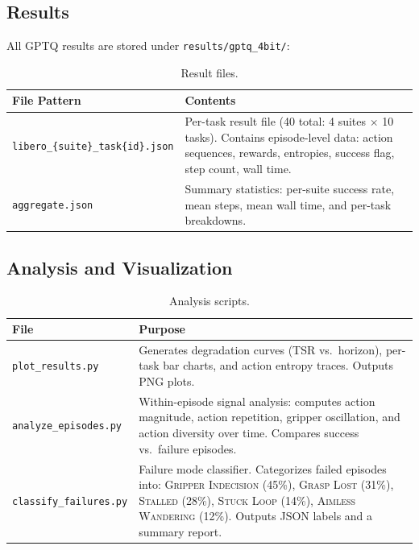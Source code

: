 \documentclass[11pt,a4paper]{article}
\begin{document}
\subsection{Results}

All GPTQ results are stored under \texttt{results/gptq\_4bit/}:

\begin{table}[h]
\centering
\begin{tabular}{@{}p{6cm}p{8.5cm}@{}}
\toprule
\textbf{File Pattern} & \textbf{Contents} \\
\midrule
\texttt{libero\_\{suite\}\_task\{id\}.json} & Per-task result file (40 total: 4 suites $\times$ 10 tasks). Contains episode-level data: action sequences, rewards, entropies, success flag, step count, wall time. \\
\texttt{aggregate.json} & Summary statistics: per-suite success rate, mean steps, mean wall time, and per-task breakdowns. \\
\bottomrule
\end{tabular}
\caption{Result files.}
\end{table}

\subsection{Analysis and Visualization}

\begin{table}[h]
\centering
\begin{tabular}{@{}p{4.5cm}p{10cm}@{}}
\toprule
\textbf{File} & \textbf{Purpose} \\
\midrule
\texttt{plot\_results.py} & Generates degradation curves (TSR vs.\ horizon), per-task bar charts, and action entropy traces. Outputs PNG plots. \\
\texttt{analyze\_episodes.py} & Within-episode signal analysis: computes action magnitude, action repetition, gripper oscillation, and action diversity over time. Compares success vs.\ failure episodes. \\
\texttt{classify\_failures.py} & Failure mode classifier. Categorizes failed episodes into: \textsc{Gripper Indecision} (45\%), \textsc{Grasp Lost} (31\%), \textsc{Stalled} (28\%), \textsc{Stuck Loop} (14\%), \textsc{Aimless Wandering} (12\%). Outputs JSON labels and a summary report. \\
\bottomrule
\end{tabular}
\caption{Analysis scripts.}
\end{table}
\end{document}
